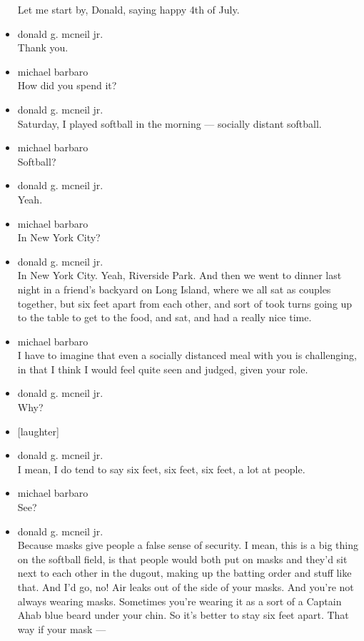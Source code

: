 \begin{itemize}
  Let me start by, Donald, saying happy 4th of July.
\item
  donald g. mcneil jr.\\
  Thank you.
\item
  michael barbaro\\
  How did you spend it?
\item
  donald g. mcneil jr.\\
  Saturday, I played softball in the morning --- socially distant
  softball.
\item
  michael barbaro\\
  Softball?
\item
  donald g. mcneil jr.\\
  Yeah.
\item
  michael barbaro\\
  In New York City?
\item
  donald g. mcneil jr.\\
  In New York City. Yeah, Riverside Park. And then we went to dinner
  last night in a friend's backyard on Long Island, where we all sat as
  couples together, but six feet apart from each other, and sort of took
  turns going up to the table to get to the food, and sat, and had a
  really nice time.
\item
  michael barbaro\\
  I have to imagine that even a socially distanced meal with you is
  challenging, in that I think I would feel quite seen and judged, given
  your role.
\item
  donald g. mcneil jr.\\
  Why?
\item
  {[}laughter{]}
\item
  donald g. mcneil jr.\\
  I mean, I do tend to say six feet, six feet, six feet, a lot at
  people.
\item
  michael barbaro\\
  See?
\item
  donald g. mcneil jr.\\
  Because masks give people a false sense of security. I mean, this is a
  big thing on the softball field, is that people would both put on
  masks and they'd sit next to each other in the dugout, making up the
  batting order and stuff like that. And I'd go, no! Air leaks out of
  the side of your masks. And you're not always wearing masks. Sometimes
  you're wearing it as a sort of a Captain Ahab blue beard under your
  chin. So it's better to stay six feet apart. That way if your mask ---

\end{itemize}
